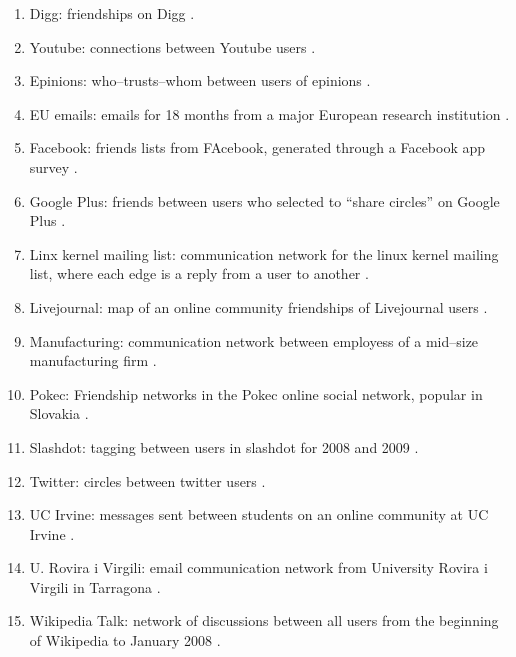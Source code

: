 \documentclass[3p,times]{elsarticle}
\begin{document}
\begin{enumerate}
\begin{enumerate}
    \item Digg: friendships on Digg \cite{digg}.
    
    \item Youtube: connections between Youtube users \cite{youtube}.
    
    \item Epinions: who--trusts--whom between users of epinions \cite{epinions}.
  
    \item EU emails: emails for 18 months from a major European research institution \cite{EU}.
    
    \item Facebook: friends lists from FAcebook, generated through a Facebook app survey \cite{facebook}.
    
    \item Google Plus: friends between users who selected to ``share circles'' on Google Plus \cite{facebook}.
    
    \item Linx kernel mailing list: communication network for the linux kernel mailing list, where each edge is a reply from a user to another \cite{linux}.

    \item Livejournal: map of an online community friendships of Livejournal users \cite{livejournal}.

    \item Manufacturing: communication network between employess of a mid--size manufacturing firm \cite{manufacturing}.
    
    \item Pokec: Friendship networks in the Pokec online social network, popular in Slovakia \cite{pokec}.
    
    \item Slashdot: tagging between users in slashdot for 2008 and 2009 \cite{livejournal}.
    
    \item Twitter: circles between twitter users \cite{facebook}.
    
    \item UC Irvine: messages sent between students on an online community at UC Irvine \cite{irvine}.
 
    \item U. Rovira i Virgili: email communication network from University Rovira i Virgili in Tarragona \cite{URV}.

    \item Wikipedia Talk: network of discussions between all users from the beginning of Wikipedia to January 2008 \cite{wiki}.


\end{enumerate}
\end{enumerate}
\end{document}

